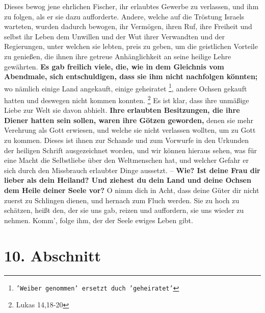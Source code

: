 Dieses bewog jene ehrlichen Fischer, ihr erlaubtes Gewerbe zu verlassen, und ihm
zu folgen, als er sie dazu aufforderte. Andere, welche auf die Tröstung Israels
warteten, wurden dadurch bewogen, ihr Vermögen, ihren Ruf, ihre Freiheit und
selbst ihr Leben dem Unwillen und der Wut ihrer Verwandten und der
Regierungen, unter welchen sie lebten, preis zu geben, um die geistlichen
Vorteile zu genießen, die ihnen ihre getreue Anhänglichkeit an seine heilige
Lehre gewährten. \textbf{Es gab freilich viele, die, wie in dem Gleichnis vom
Abendmale, sich entschuldigen, dass sie ihm nicht nachfolgen könnten;} wo
nämlich
einige Land angekauft, einige geheiratet \footnote{\texttt{'Weiber genommen' ersetzt
duch 'geheiratet'}}, andere Ochsen gekauft hatten und
deswegen nicht kommen konnten.
\footnote{Lukas  14,18-20}
Es ist klar, dass ihre 
unmäßige Liebe zur Welt sie davon abhielt. \textbf{Ihre erlaubten Besitzungen,
die ihre
Diener hatten sein sollen, waren ihre Götzen  geworden,} denen sie
mehr Verehrung
als Gott erwiesen, und welche sie nicht verlassen wollten, um zu Gott zu kommen.
Dieses ist ihnen zur Schande und zum Vorwurfe in den Urkunden der heiligen
Schrift ausgezeichnet worden, und wir können hieraus sehen, was für eine Macht
die Selbstliebe über den Weltmenschen hat, und welcher Gefahr er sich durch den
Missbrauch erlaubter Dinge aussetzt. -- \textbf{Wie? Ist deine Frau dir lieber
als dein
Heiland? Und ziehest du dein Land und deine Ochsen dem Heile deiner Seele vor?}
O
nimm dich in Acht, dass deine Güter dir nicht zuerst zu Schlingen dienen, und
hernach zum Fluch werden. Sie zu hoch zu schätzen, heißt den, der sie uns gab,
reizen und auffordern, sie uns wieder zu nehmen. Komm', folge ihm, der der Seele
ewiges Leben gibt.

\section{10. Abschnitt} \label{kap4_ab10}

